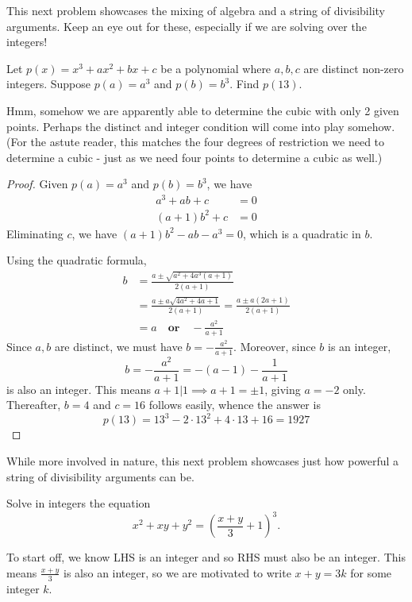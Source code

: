 \documentclass[../main.tex]{subfiles}
\begin{document}
This next problem showcases the mixing of algebra and a string of divisibility arguments. Keep an eye out for these, especially if we are solving over the integers!
\begin{example}[2018 SMO(O) P9]
    Let $p(x)=x^3+ax^2+bx+c$ be a polynomial where $a,b,c$ are distinct non-zero integers. Suppose $p(a)=a^3$ and $p(b)=b^3$. Find $p(13)$.
\end{example}
Hmm, somehow we are apparently able to determine the cubic with only 2 given points. Perhaps the distinct and integer condition will come into play somehow. (For the astute reader, this matches the four degrees of restriction we need to determine a cubic - just as we need four points to determine a cubic as well.)
\begin{proof}
    Given $p(a)=a^3$ and $p(b)=b^3$, we have 
    \begin{align*}
        a^3+ab+c&=0\\
        (a+1)b^2+c&=0
    \end{align*}
    Eliminating $c$,
    we have $(a+1)b^2-ab-a^3=0$, which is a quadratic in $b$.
    
    Using the quadratic formula,
    \begin{align*}
        b&=\frac{a\pm \sqrt{a^2+4a^3(a+1)}}{2(a+1)}\\
        &=\frac{a\pm a\sqrt{4a^2+4a+1}}{2(a+1)}=\frac{a\pm a(2a+1)}{2(a+1)} \\
        &=a \quad \textbf{or} \quad -\frac{a^2}{a+1}
    \end{align*}
    Since $a,b$ are distinct, we must have $b=-\frac{a^2}{a+1}.$
    Moreover, since $b$ is an integer, 
    $$b=-\frac{a^2}{a+1}=-(a-1)-\frac{1}{a+1}$$
    is also an integer. This means $a+1|1 \implies a+1=\pm 1$, giving $a=-2$ only. Thereafter, $b=4$ and $c=16$ follows easily, whence the answer is 
    $$p(13)=13^3-2\cdot 13^2+4\cdot 13+16=\boxed{1927}$$
\end{proof}

While more involved in nature, this next problem showcases just how powerful a string of divisibility arguments can be.
\begin{example}
Solve in integers the equation
$$x^2+xy+y^2=\left(\frac{x+y}{3}+1\right)^3.$$
\end{example}
To start off, we know LHS is an integer and so RHS must also be an integer. This means $\frac{x+y}{3}$ is also an integer, so we are motivated to write $x+y=3k$ for some integer $k$.
\end{document}
